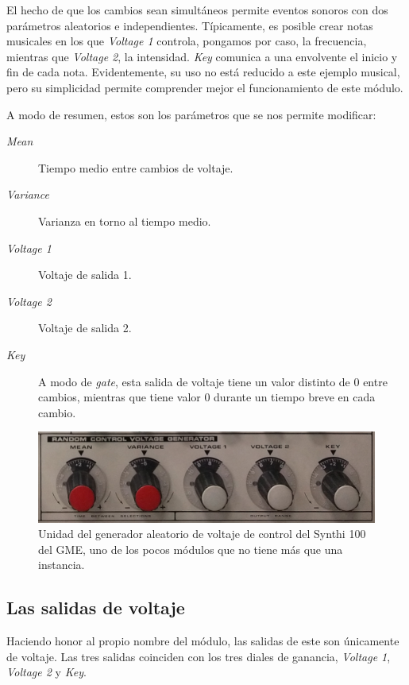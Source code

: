 El hecho de que los cambios sean simultáneos permite eventos sonoros con dos parámetros aleatorios e independientes. Típicamente, es posible crear notas musicales en los que \textit{Voltage 1} controla, pongamos por caso, la frecuencia, mientras que \textit{Voltage 2}, la intensidad. \textit{Key} comunica a una envolvente el inicio y fin de cada nota. Evidentemente, su uso no está reducido a este ejemplo musical, pero su simplicidad permite comprender mejor el funcionamiento de este módulo.

A modo de resumen, estos son los parámetros que se nos permite modificar:

\begin{description}
	\item[\textit{Mean}] Tiempo medio entre cambios de voltaje. 
	\item[\textit{Variance}] Varianza en torno al tiempo medio.
	\item[\textit{Voltage 1}] Voltaje de salida 1.
	\item[\textit{Voltage 2}] Voltaje de salida 2.
	\item[\textit{Key}] A modo de \textit{gate}, esta salida de voltaje tiene un valor distinto de 0 entre cambios, mientras que tiene valor 0 durante un tiempo breve en cada cambio.
\end{description}


\begin{figure}
	\centering
	\includegraphics[width=1\textwidth]{images/random_generator}
	\caption[\textit{Random Voltage Control Generator}]{Unidad del generador aleatorio de voltaje de control del Synthi 100 del GME, uno de los pocos módulos que no tiene más que una instancia.}
	\label{fig:random_generator}
\end{figure}

\subsection{Las salidas de voltaje}

Haciendo honor al propio nombre del módulo, las salidas de este son únicamente de voltaje. Las tres salidas coinciden con los tres diales de ganancia, \textit{Voltage 1}, \textit{Voltage 2} y \textit{Key}.


